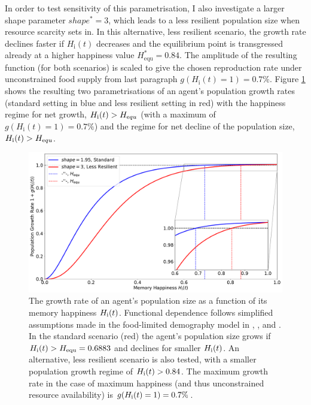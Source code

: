 In order to test sensitivity of this parametrisation, I also investigate a larger shape parameter $shape^*=3$, which leads to a less resilient population size when resource scarcity sets in.
In this alternative, less resilient scenario, the growth rate declines faster if $H_\text{i}(t)$ decreases and the equilibrium point is transgressed already at a higher happiness value $H_\text{equ}^*=0.84$.  %
The amplitude of the resulting function (for both scenarios) is scaled to give the chosen reproduction rate under unconstrained food supply from last paragraph 
$g(H_\text{i}(t)=1)=0.7\%$.
Figure \ref{fig:growthrate} shows the resulting two parametrisations of an agent's population growth rates (standard setting in blue and less resilient setting in red) with the happiness regime for net growth, $H_\text{i}(t) > H_{\text equ}$ (with a maximum of $g(H_\text{i}(t)=1)=0.7\%$) and the regime for net decline of the population size, $H_\text{i}(t) > H_{\text equ}$.
\begin{figure}
	\centering
	\includegraphics[width=\textwidth]{images/populationchange_g}
	\caption{The growth rate of an agent's population size as a function of its memory happiness $H_{\rm i}(t)$. Functional dependence follows simplified assumptions made in the food-limited demography model in \citet{Lee2008}, \citet{Puleston2008}, and \citet{Puleston2017}. In the standard scenario (red) the agent's population size grows if $H_{\rm i}(t)>H_{\rm equ}=0.6883$ and declines for smaller $H_{\rm i}(t)$. An alternative, less resilient scenario is also tested, with a smaller population growth regime of $H_{\rm i}(t)>0.84$. The maximum growth rate in the case of maximum happiness (and thus unconstrained resource availability) is $g(H_{\rm i}(t)=1)=0.7\%$.}
	\label{fig:growthrate}
\end{figure}

